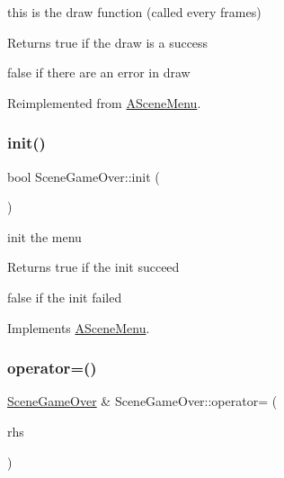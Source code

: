 this is the draw function (called every frames) 

\begin{DoxyReturn}{Returns}
true if the draw is a success 

false if there are an error in draw 
\end{DoxyReturn}


Reimplemented from \hyperlink{class_a_scene_menu_a5c11f34c83f025e1181219bf25ce4694}{A\+Scene\+Menu}.

\mbox{\label{class_scene_game_over_a7ddd370503e10ff64e3d023f0a0acdb8}} 
\subsubsection{\texorpdfstring{init()}{init()}}
{\footnotesize\ttfamily bool Scene\+Game\+Over\+::init (\begin{DoxyParamCaption}{ }\end{DoxyParamCaption})\hspace{0.3cm}{\ttfamily [virtual]}}



init the menu 

\begin{DoxyReturn}{Returns}
true if the init succeed 

false if the init failed 
\end{DoxyReturn}


Implements \hyperlink{class_a_scene_menu_a78bdee98bd7df224524586a060f9bdec}{A\+Scene\+Menu}.

\mbox{\label{class_scene_game_over_a3484a9ad054f0104cada049f4c06d060}} 
\subsubsection{\texorpdfstring{operator=()}{operator=()}}
{\footnotesize\ttfamily \hyperlink{class_scene_game_over}{Scene\+Game\+Over} \& Scene\+Game\+Over\+::operator= (\begin{DoxyParamCaption}\item[{\hyperlink{class_scene_game_over}{Scene\+Game\+Over} const \&}]{rhs }\end{DoxyParamCaption})}




